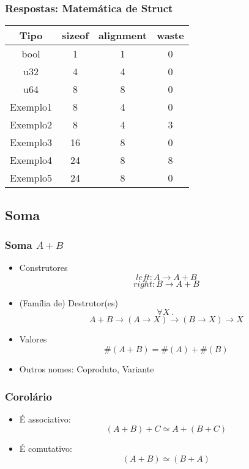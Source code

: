 \documentclass{beamer}
\renewcommand{\d}{\:.\:}
\newcommand{\typetam}{\#}
\newcommand{\typesim}{\simeq}
\begin{document}
\begin{frame}
    \frametitle{Respostas: Matemática de Struct}
    \begin{center} \begin{tabular}{|c|c|c||c|}
        \hline%
        Tipo      & sizeof & alignment & waste \\\hline
        \hline
        bool      & 1      & 1         & 0     \\\hline
        u32       & 4      & 4         & 0     \\\hline
        u64       & 8      & 8         & 0     \\\hline
        \hline
        Exemplo1  & 8      & 4         & 0     \\\hline
        Exemplo2  & 8      & 4         & 3     \\\hline
        Exemplo3  & 16     & 8         & 0     \\\hline
        Exemplo4  & 24     & 8         & 8     \\\hline
        Exemplo5  & 24     & 8         & 0     \\\hline
    \end{tabular} \end{center}
\end{frame}

\subsection{Soma}
\begin{frame}
    \frametitle{Soma \(A + B\)}
    \begin{itemize}
        \item Construtores
            \[
                left : A \to A + B
            \] \[
                right : B \to A + B
            \]
            \vfill
        \item (Família de) Destrutor(es)
            \[
                \forall X \d
            \] \[
                A + B \to (A \to X) \to (B \to X) \to X
            \]
            \vfill
        \item Valores
            \[
                \typetam(A + B) = \typetam(A) + \typetam(B)
            \]
            \vfill
        \item Outros nomes: Coproduto, Variante
    \end{itemize}
\end{frame}

\begin{frame}
    \frametitle{Corolário}
    \begin{itemize}
        \item É associativo:
            \[
                (A + B) + C \typesim A + (B + C)
            \]
            \vfill
        \item É comutativo:
            \[
                (A + B) \typesim (B + A)
            \]
    \end{itemize}
\end{frame}
\end{document}
